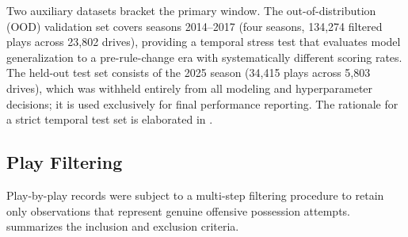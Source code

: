 Two auxiliary datasets bracket the primary window. The
out-of-distribution (OOD) validation set covers seasons 2014--2017
(four seasons, 134,274 filtered plays across 23,802 drives), providing a
temporal stress test that evaluates model generalization to a pre-rule-change
era with systematically different scoring rates. The held-out test set
consists of the 2025 season (34,415 plays across 5,803 drives), which was
withheld entirely from all modeling and hyperparameter decisions; it is used
exclusively for final performance reporting. The rationale for a strict temporal test set is elaborated in
.

\subsection{Play Filtering}
\label{sec:play-filtering}

Play-by-play records were subject to a multi-step filtering procedure to
retain only observations that represent genuine offensive possession attempts.
 summarizes the inclusion and exclusion criteria.

